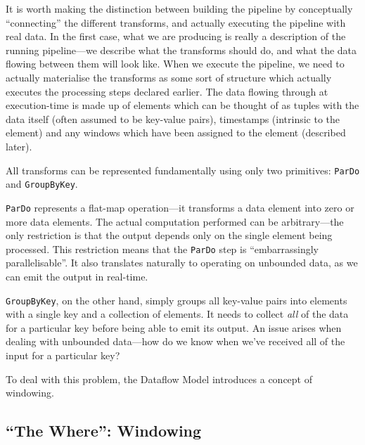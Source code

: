 It is worth making the distinction between building the pipeline by conceptually ``connecting'' the different transforms, and actually executing the pipeline with real data.
In the first case, what we are producing is really a description of the running pipeline---we describe what the transforms should do, and what the data flowing between them will look like.
When we execute the pipeline, we need to actually materialise the transforms as some sort of structure which actually executes the processing steps declared earlier.
The data flowing through at execution-time is made up of elements which can be thought of as tuples with the data itself (often assumed to be key-value pairs), timestamps (intrinsic to the element) and any windows which have been assigned to the element (described later).

All transforms can be represented fundamentally using only two primitives: \verb|ParDo| and \verb|GroupByKey|\footnotemark[2].



\verb|ParDo| represents a flat-map operation---it transforms a data element into zero or more data elements.
The actual computation performed can be arbitrary---the only restriction is that the output depends only on the single element being processed.
This restriction means that the \verb|ParDo| step is ``embarrassingly parallelisable''.
It also translates naturally to operating on unbounded data, as we can emit the output in real-time.

\verb|GroupByKey|, on the other hand, simply groups all key-value pairs into elements with a single key and a collection of elements.
It needs to collect \emph{all} of the data for a particular key before being able to emit its output.
An issue arises when dealing with unbounded data---how do we know when we've received all of the input for a particular key?

To deal with this problem, the Dataflow Model introduces a concept of windowing.

\subsection{``The Where'': Windowing}\label{sec:prep:dataflow:where}

